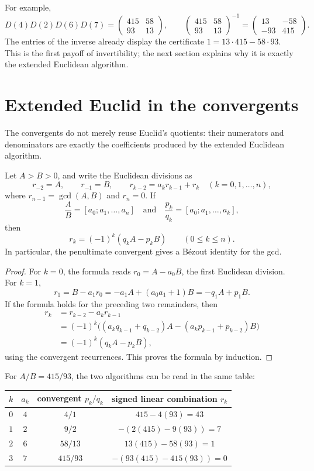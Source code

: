 For example,
\[
 D(4)D(2)D(6)D(7)
 =\begin{pmatrix}415&58\\93&13\end{pmatrix},\qquad
 \begin{pmatrix}415&58\\93&13\end{pmatrix}^{-1}
 =\begin{pmatrix}13&-58\\-93&415\end{pmatrix}.
\]
The entries of the inverse already display the certificate
$1=13\cdot415-58\cdot93$. This is the first payoff of invertibility; the next
section explains why it is exactly the extended Euclidean algorithm.

\section{Extended Euclid in the convergents}

The convergents do not merely reuse Euclid's quotients: their numerators and
denominators are exactly the coefficients produced by the extended Euclidean
algorithm.

\begin{theorem}
Let $A>B>0$, and write the Euclidean divisions as
\[
 r_{-2}=A,\qquad r_{-1}=B,\qquad
 r_{k-2}=a_k r_{k-1}+r_k\quad(k=0,1,\dots,n),
\]
where $r_{n-1}=\gcd(A,B)$ and $r_n=0$. If
\[
  \frac AB=[a_0;a_1,\dots,a_n]
  \quad\text{and}\quad
  \frac{p_k}{q_k}=[a_0;a_1,\dots,a_k],
\]
then
\[
  \boxed{r_k=(-1)^k(q_kA-p_kB)}\qquad(0\le k\le n).
\]
In particular, the penultimate convergent gives a B\'ezout identity for the gcd.
\end{theorem}

\begin{proof}
For $k=0$, the formula reads $r_0=A-a_0B$, the first Euclidean division. For
$k=1$,
\[
  r_1=B-a_1r_0=-a_1A+(a_0a_1+1)B=-q_1A+p_1B.
\]
If the formula holds for the preceding two remainders, then
\begin{align*}
r_k&=r_{k-2}-a_kr_{k-1}\\
&=(-1)^k\bigl((a_kq_{k-1}+q_{k-2})A
 -(a_kp_{k-1}+p_{k-2})B\bigr)\\
&=(-1)^k(q_kA-p_kB),
\end{align*}
using the convergent recurrences. This proves the formula by induction.
\end{proof}

For $A/B=415/93$, the two algorithms can be read in the same table:
\begin{center}
\small
\begin{tabular}{cccc}
\toprule
$k$ & $a_k$ & convergent $p_k/q_k$ & signed linear combination $r_k$ \\
\midrule
$0$ & $4$ & $4/1$ & $415-4(93)=43$ \\
$1$ & $2$ & $9/2$ & $-(2(415)-9(93))=7$ \\
$2$ & $6$ & $58/13$ & $13(415)-58(93)=1$ \\
$3$ & $7$ & $415/93$ & $-(93(415)-415(93))=0$ \\
\bottomrule
\end{tabular}
\end{center}

